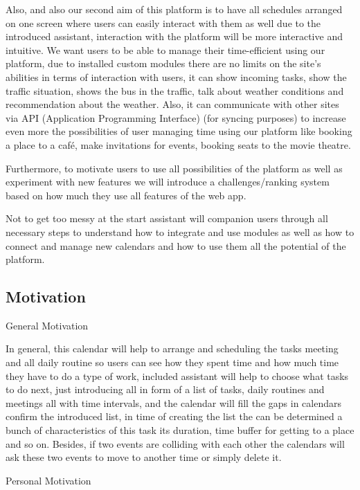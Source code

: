 Also, and also our second aim of this platform is to have all schedules arranged on one screen where users can easily interact with them as well due to the introduced assistant, interaction with the platform will be more interactive and intuitive. We want users to be able to manage their time-efficient using our platform, due to installed custom modules there are no limits on the site's abilities in terms of interaction with users, it can show incoming tasks, show the traffic situation, shows the bus in the traffic, talk about weather conditions and recommendation about the weather. Also, it can communicate with other sites via API (Application Programming Interface) (for syncing purposes) to increase even more the possibilities of user managing time using our platform like booking a place to a café, make invitations for events, booking seats to the movie theatre.  

Furthermore, to motivate users to use all possibilities of the platform as well as experiment with new features we will introduce a challenges/ranking system based on how much they use all features of the web app.  

Not to get too messy at the start assistant will companion users through all necessary steps to understand how to integrate and use modules as well as how to connect and manage new calendars and how to use them all the potential of the platform.  

\subsection{Motivation}
\par 
General Motivation 

In general, this calendar will help to arrange and scheduling the tasks meeting and all daily routine so users can see how they spent time and how much time they have to do a type of work, included assistant will help to choose what tasks to do next, just introducing all in form of a list of tasks, daily routines and meetings all with time intervals, and the calendar will fill the gaps in calendars confirm the introduced list, in time of creating the list the can be determined a bunch of characteristics of this task its duration, time buffer for getting to a place and so on. Besides, if two events are colliding with each other the calendars will ask these two events to move to another time or simply delete it. 

Personal Motivation 

